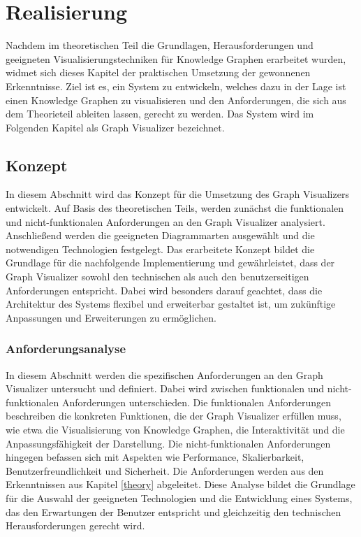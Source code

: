 
\chapter{Realisierung}

Nachdem im theoretischen Teil die Grundlagen, Herausforderungen und geeigneten Visualisierungstechniken für Knowledge Graphen erarbeitet wurden, widmet sich dieses Kapitel der praktischen Umsetzung der gewonnenen Erkenntnisse. Ziel ist es, ein System zu entwickeln, welches dazu in der Lage ist einen Knowledge Graphen zu visualisieren und den Anforderungen, die sich aus dem Theorieteil ableiten lassen, gerecht zu werden. Das System wird im Folgenden Kapitel als Graph Visualizer bezeichnet.

\section{Konzept}

In diesem Abschnitt wird das Konzept für die Umsetzung des Graph Visualizers entwickelt. Auf Basis des theoretischen Teils, werden zunächst die funktionalen und nicht-funktionalen Anforderungen an den Graph Visualizer analysiert. Anschließend werden die geeigneten Diagrammarten ausgewählt und die notwendigen Technologien festgelegt. Das erarbeitete Konzept bildet die Grundlage für die nachfolgende Implementierung und gewährleistet, dass der Graph Visualizer sowohl den technischen als auch den benutzerseitigen Anforderungen entspricht. Dabei wird besonders darauf geachtet, dass die Architektur des Systems flexibel und erweiterbar gestaltet ist, um zukünftige Anpassungen und Erweiterungen zu ermöglichen.

\subsection{Anforderungsanalyse}
\label{realization:requirements}

In diesem Abschnitt werden die spezifischen Anforderungen an den Graph Visualizer untersucht und definiert. Dabei wird zwischen funktionalen und nicht-funktionalen Anforderungen unterschieden. Die funktionalen Anforderungen beschreiben die konkreten Funktionen, die der Graph Visualizer erfüllen muss, wie etwa die Visualisierung von Knowledge Graphen, die Interaktivität und die Anpassungsfähigkeit der Darstellung. Die nicht-funktionalen Anforderungen hingegen befassen sich mit Aspekten wie Performance, Skalierbarkeit, Benutzerfreundlichkeit und Sicherheit. Die Anforderungen werden aus den Erkenntnissen aus Kapitel \ref{theory} abgeleitet. Diese Analyse bildet die Grundlage für die Auswahl der geeigneten Technologien und die Entwicklung eines Systems, das den Erwartungen der Benutzer entspricht und gleichzeitig den technischen Herausforderungen gerecht wird.

